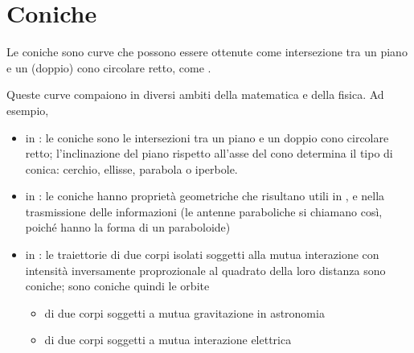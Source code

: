 \documentclass[letterpaper,10pt,italian]{jupyterBook}
\begin{document}
\sphinxstepscope


\section{Coniche}
\label{\detokenize{ch/analytic_geometry/analytic_geometry_2d/conics:coniche}}\label{\detokenize{ch/analytic_geometry/analytic_geometry_2d/conics:geometry-analytic-2d-conics}}\label{\detokenize{ch/analytic_geometry/analytic_geometry_2d/conics::doc}}
\sphinxAtStartPar
Le coniche sono curve che possono essere ottenute come intersezione tra un piano e un (doppio) cono circolare retto, come {\hyperref[\detokenize{ch/analytic_geometry/analytic_geometry_3d/cone:geometry-analytic-3d-cone-conics}]{}}.

\sphinxAtStartPar
Queste curve compaiono in diversi ambiti della matematica e della fisica. Ad esempio,
\begin{itemize}
\item {} 
\sphinxAtStartPar
in : le coniche sono le intersezioni tra un piano e un doppio cono circolare retto; l’inclinazione del piano rispetto all’asse del cono determina il tipo di conica: cerchio, ellisse, parabola o iperbole.

\item {} 
\sphinxAtStartPar
in : le coniche hanno proprietà geometriche che risultano utili in , e nella trasmissione delle informazioni (le antenne paraboliche si chiamano così, poiché hanno la forma di un paraboloide)

\item {} 
\sphinxAtStartPar
in : le traiettorie di due corpi isolati soggetti alla mutua interazione con intensità inversamente proprozionale al quadrato della loro distanza sono coniche; sono coniche quindi le orbite
\begin{itemize}
\item {} 
\sphinxAtStartPar
di due corpi soggetti a mutua gravitazione in astronomia

\item {} 
\sphinxAtStartPar
di due corpi soggetti a mutua interazione elettrica

\end{itemize}

\end{itemize}
\end{document}
